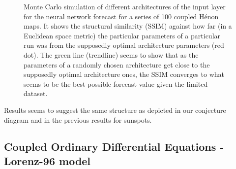 \documentclass[journal]{IEEEtran}
\begin{document}
\begin{figure}[!ht]
\centering
{}
\caption{Monte Carlo simulation of different architectures of the input layer for the neural network forecast for a series of 100 coupled
H\'{e}non maps.
It shows the structural similarity (SSIM) against how far (in a Euclidean space metric) the particular parameters of a particular
run was from the supposedly optimal architecture parameters (red dot). The green line (trendline) seems to show that as the parameters
of a randomly chosen architecture get close to the supposedly optimal architecture ones, the SSIM converges to what seems to be the
best possible forecast value given the limited dataset.}
\label{MonteCarloSSIMversusParameterMetricDistance100HenonCoupledMaps}
\end{figure}

Results seems to suggest the same structure as depicted in our conjecture diagram and in the previous results for sunspots.

\subsection{Coupled Ordinary Differential Equations - Lorenz-96 model}

\end{document}
